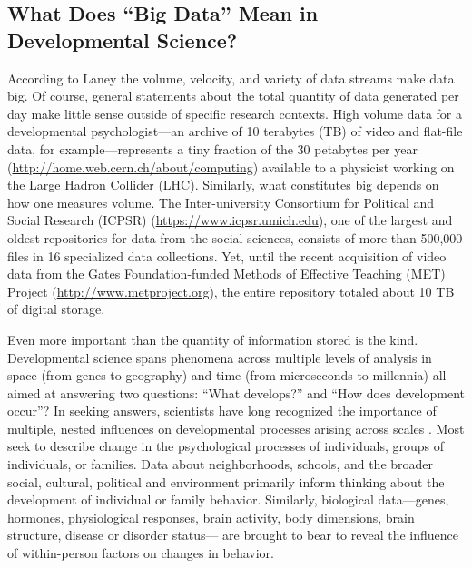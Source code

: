 \documentclass[letterpaper,man,apacite,natbib]{apa6}
\begin{document}
\subsection{What Does ``Big Data'' Mean in Developmental Science?}
According to Laney \citeyear{laney01controlling3v} the volume, velocity, and variety of data streams make data big.
Of course, general statements about the total quantity of data generated per day \cite{ibm_2015} make little sense outside of specific research contexts.
High volume data for a developmental psychologist---an archive of 10 terabytes (TB) of video and flat-file data, for example---represents a tiny fraction of the 30 petabytes per year (\url{http://home.web.cern.ch/about/computing}) available to a physicist working on the Large Hadron Collider (LHC).
Similarly, what constitutes big depends on how one measures volume.
The Inter-university Consortium for Political and Social Research (ICPSR) (\url{https://www.icpsr.umich.edu}), one of the largest and oldest repositories for data from the social sciences, consists of more than 500,000 files in 16 specialized data collections.
Yet, until the recent acquisition of video data from the Gates Foundation-funded Methods of Effective Teaching (MET) Project (\url{http://www.metproject.org}), the entire repository totaled about 10 TB of digital storage.

Even more important than the quantity of information stored is the kind.
Developmental science spans phenomena across multiple levels of analysis in space (from genes to geography) and time (from microseconds to millennia) all aimed at answering two questions: ``What develops?'' and  ``How does development occur''?
In seeking answers, scientists have long recognized the importance of multiple, nested influences on developmental processes arising across scales \cite{elman_rethinking_1998,gottlieb_normally_1998,oyama_ontogeny_2000,vygotsky_mind_1980}.
Most seek to describe change in the psychological processes of individuals, groups of individuals, or families.
Data about neighborhoods, schools, and the broader social, cultural, political and environment primarily inform thinking about the development of individual or family behavior.
Similarly, biological data---genes, hormones, physiological responses, brain activity, body dimensions, brain structure, disease or disorder status--- are brought to bear to reveal the influence of within-person factors on changes in behavior.
\end{document}
